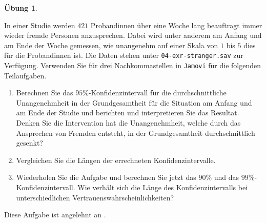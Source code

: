 \documentclass[
]{book}
\providecommand{\tightlist}{%
  \setlength{\itemsep}{0pt}\setlength{\parskip}{0pt}}
\theoremstyle{definition}
\theoremstyle{definition}
\theoremstyle{definition}
\newtheorem{exercise}{Übung}[chapter]
\theoremstyle{definition}
\theoremstyle{remark}
\begin{document}
\begin{exercise}
\protect\hypertarget{exr:stranger}{}\label{exr:stranger}\leavevmode

In einer Studie werden \(421\) Probandinnen über eine Woche lang beauftragt immer wieder fremde Personen anzusprechen. Dabei wird unter anderem am Anfang und am Ende der Woche gemessen, wie unangenehm auf einer Skala von \(1\) bis \(5\) dies für die Probandinnen ist. Die Daten stehen unter \texttt{04-exr-stranger.sav} zur Verfügung. Verwenden Sie für drei Nachkommastellen in \texttt{Jamovi} für die folgenden Teilaufgaben.

\begin{enumerate}
\def\labelenumi{(\alph{enumi})}
\tightlist
\item
  Berechnen Sie das \(95\%\)-Konfidenzintervall für die durchschnittliche Unangenehmheit in der Grundgesamtheit für die Situation am Anfang und am Ende der Studie und berichten und interpretieren Sie das Resultat. Denken Sie die Intervention hat die Unangenehmheit, welche durch das Ansprechen von Fremden entsteht, in der Grundgesamtheit durchschnittlich gesenkt?
\item
  Vergleichen Sie die Längen der errechneten Konfidenzintervalle.
\item
  Wiederholen Sie die Aufgabe und berechnen Sie jetzt das \(90\%\) und das \(99\%\)-Konfidenzintervall. Wie verhält sich die Länge des Konfidenzintervalls bei unterschiedlichen Vertrauenswahrscheinlichkeiten?
\end{enumerate}

Diese Aufgabe ist angelehnt an \citet{sandstrom2022}.

\end{exercise}
\end{document}
